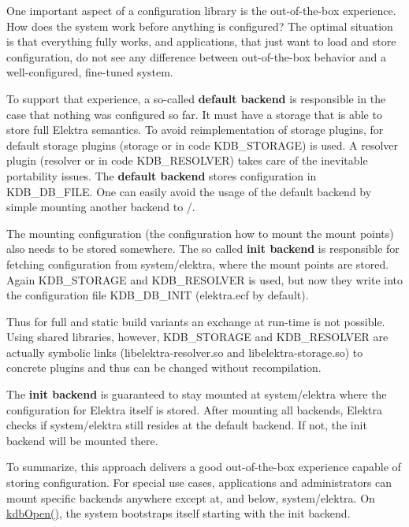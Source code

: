 One important aspect of a configuration library is the out-\/of-\/the-\/box experience. How does the system work before anything is configured? The optimal situation is that everything fully works, and applications, that just want to load and store configuration, do not see any difference between out-\/of-\/the-\/box behavior and a well-\/configured, fine-\/tuned system.

To support that experience, a so-\/called {\bfseries default backend} is responsible in the case that nothing was configured so far. It must have a storage that is able to store full Elektra semantics. To avoid reimplementation of storage plugins, for default storage plugins ({\ttfamily storage} or in code {\ttfamily K\+D\+B\+\_\+\+S\+T\+O\+R\+A\+GE}) is used. A resolver plugin ({\ttfamily resolver} or in code {\ttfamily K\+D\+B\+\_\+\+R\+E\+S\+O\+L\+V\+ER}) takes care of the inevitable portability issues. The {\bfseries default backend} stores configuration in {\ttfamily K\+D\+B\+\_\+\+D\+B\+\_\+\+F\+I\+LE}. One can easily avoid the usage of the default backend by simple mounting another backend to {\ttfamily /}.

The mounting configuration (the configuration how to mount the mount points) also needs to be stored somewhere. The so called {\bfseries init backend} is responsible for fetching configuration from {\ttfamily system/elektra}, where the mount points are stored. Again {\ttfamily K\+D\+B\+\_\+\+S\+T\+O\+R\+A\+GE} and {\ttfamily K\+D\+B\+\_\+\+R\+E\+S\+O\+L\+V\+ER} is used, but now they write into the configuration file {\ttfamily K\+D\+B\+\_\+\+D\+B\+\_\+\+I\+N\+IT} (elektra.\+ecf by default).

Thus for full and static build variants an exchange at run-\/time is not possible. Using shared libraries, however, {\ttfamily K\+D\+B\+\_\+\+S\+T\+O\+R\+A\+GE} and {\ttfamily K\+D\+B\+\_\+\+R\+E\+S\+O\+L\+V\+ER} are actually symbolic links ({\ttfamily libelektra-\/resolver.\+so} and {\ttfamily libelektra-\/storage.\+so}) to concrete plugins and thus can be changed without recompilation.

The {\bfseries init backend} is guaranteed to stay mounted at {\ttfamily system/elektra} where the configuration for Elektra itself is stored. After mounting all backends, Elektra checks if {\ttfamily system/elektra} still resides at the default backend. If not, the init backend will be mounted there.

To summarize, this approach delivers a good out-\/of-\/the-\/box experience capable of storing configuration. For special use cases, applications and administrators can mount specific backends anywhere except at, and below, {\ttfamily system/elektra}. On {\ttfamily \hyperlink{group__kdb_ga6808defe5870f328dd17910aacbdc6ca}{kdb\+Open()}}, the system bootstraps itself starting with the init backend.

